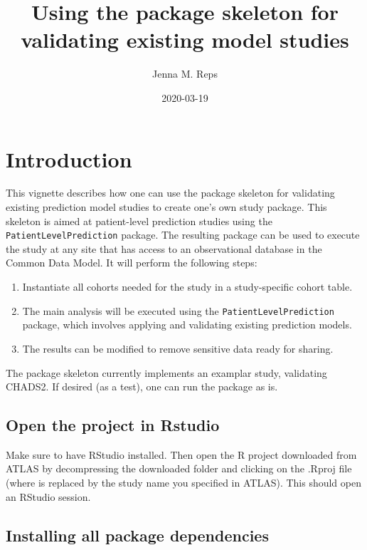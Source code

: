\documentclass[
]{article}
\title{Using the package skeleton for validating existing model studies}
\author{Jenna M. Reps}
\date{2020-03-19}
\providecommand{\tightlist}{%
  \setlength{\itemsep}{0pt}\setlength{\parskip}{0pt}}
\begin{document}
\maketitle

{
\setcounter{tocdepth}{2}
\tableofcontents
}
\hypertarget{introduction}{%
\section{Introduction}\label{introduction}}

This vignette describes how one can use the package skeleton for
validating existing prediction model studies to create one's own study
package. This skeleton is aimed at patient-level prediction studies
using the \texttt{PatientLevelPrediction} package. The resulting package
can be used to execute the study at any site that has access to an
observational database in the Common Data Model. It will perform the
following steps:

\begin{enumerate}
\def\labelenumi{\arabic{enumi}.}
\tightlist
\item
  Instantiate all cohorts needed for the study in a study-specific
  cohort table.
\item
  The main analysis will be executed using the
  \texttt{PatientLevelPrediction} package, which involves applying and
  validating existing prediction models.
\item
  The results can be modified to remove sensitive data ready for
  sharing.
\end{enumerate}

The package skeleton currently implements an examplar study, validating
CHADS2. If desired (as a test), one can run the package as is.

\hypertarget{open-the-project-in-rstudio}{%
\subsection{Open the project in
Rstudio}\label{open-the-project-in-rstudio}}

Make sure to have RStudio installed. Then open the R project downloaded
from ATLAS by decompressing the downloaded folder and clicking on the
.Rproj file (where is replaced by the study name you specified in
ATLAS). This should open an RStudio session.

\hypertarget{installing-all-package-dependencies}{%
\subsection{Installing all package
dependencies}\label{installing-all-package-dependencies}}
\end{document}
